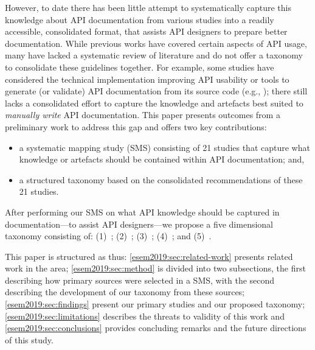 However, to date there has been little attempt to systematically capture this knowledge about API documentation from various studies into a readily accessible, consolidated format, that assists API designers to prepare better documentation. While previous works have covered certain aspects of API usage, many have lacked a systematic review of literature and do not offer a taxonomy to consolidate these guidelines together. For example, some studies have considered the technical implementation improving API usability or tools to generate (or validate) API documentation from its source code (e.g., \citep{Nybom:2018ef,Watson:2012uy,Maalej:2013uu}); there still lacks a consolidated effort to capture the knowledge and artefacts best suited to \textit{manually write} API documentation.
This paper presents outcomes from a preliminary work to address this gap and offers two key contributions:
\begin{itemize}
  \item a systematic mapping study (SMS) consisting of 21 studies that capture what knowledge or artefacts should be contained within API documentation; and,
  \item a structured taxonomy based on the consolidated recommendations of these 21 studies.
\end{itemize}
After performing our SMS on what API knowledge should be captured in documentation---to assist API designers---we propose a five dimensional taxonomy consisting of: (1)~\dima{}; (2)~\dimb{}; (3)~\dimc{}; (4)~\dimd{}; and (5)~\dime{}.

This paper is structured as thus: \cref{esem2019:sec:related-work} presents related work in the area; \cref{esem2019:sec:method} is divided into two subsections, the first describing how primary sources were selected in a SMS, with the second describing the development of our taxonomy from these sources; \cref{esem2019:sec:findings} present our primary studies and our proposed taxonomy; \cref{esem2019:sec:limitations} describes the threats to validity of this work and \cref{esem2019:sec:conclusions} provides concluding remarks and the future directions of this study.

